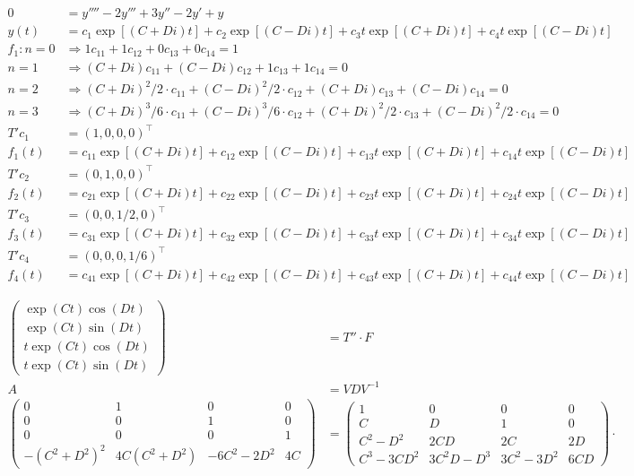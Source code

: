 \documentclass[12pt,a4paper]{article}
\begin{document}
\begin{align}
0 &= y'''' - 2 y''' + 3 y'' - 2y' + y \\
y(t) &= c_1 \exp[(C + Di)t] + c_2 \exp[(C - Di)t] + c_3 t \exp[(C + Di)t] + c_4 t \exp[(C - Di)t] \\
f_1: n = 0 &\Rightarrow 1 c_{11} + 1 c_{12} + 0 c_{13} + 0 c_{14} = 1 \\
n = 1 &\Rightarrow (C + Di) c_{11} + (C - Di) c_{12} + 1 c_{13} + 1 c_{14} = 0  \\
n = 2 &\Rightarrow (C + Di)^2/2\cdot c_{11} + (C - Di)^2/2\cdot c_{12} + (C + Di) c_{13} + (C - Di) c_{14} = 0 \\
n = 3 &\Rightarrow (C + Di)^3/6\cdot c_{11} + (C - Di)^3/6\cdot c_{12} + (C + Di)^2/2\cdot c_{13} + (C - Di)^2/2\cdot c_{14} = 0 \\
T' c_1 &= (1,0,0,0)^\top \\
f_1(t) &= c_{11} \exp[(C + Di)t] + c_{12} \exp[(C - Di)t] + c_{13} t \exp[(C + Di)t] + c_{14} t \exp[(C - Di)t] \\
T' c_2 &= (0,1,0,0)^\top \\
f_2(t) &= c_{21} \exp[(C + Di)t] + c_{22} \exp[(C - Di)t] + c_{23} t \exp[(C + Di)t] + c_{24} t \exp[(C - Di)t] \\
T' c_3 &= (0,0,1/2,0)^\top \\
f_3(t) &= c_{31} \exp[(C + Di)t] + c_{32} \exp[(C - Di)t] + c_{33} t \exp[(C + Di)t] + c_{34} t \exp[(C - Di)t] \\
T' c_4 &= (0,0,0,1/6)^\top \\
f_4(t) &= c_{41} \exp[(C + Di)t] + c_{42} \exp[(C - Di)t] + c_{43} t \exp[(C + Di)t] + c_{44} t \exp[(C - Di)t]
\end{align}

\begin{align}
\begin{pmatrix} \exp (Ct) \cos (Dt) \\ \exp (Ct) \sin (Dt) \\ t \exp (Ct) \cos (Dt)  \\ t \exp (Ct) \sin (Dt) \end{pmatrix} &= T'' \cdot F  \\
A &= VDV^{-1} \\
\left( \begin{matrix} 0 & 1 & 0 & 0 \\ 0 & 0 & 1 & 0 \\ 0 & 0 & 0 & 1 \\ -(C^2+D^2)^2 & 4C(C^2+D^2) & -6C^2-2D^2 & 4C \end{matrix} \right)
&=
\left( \begin{matrix}  1 & 0 & 0 & 0 \\ C & D & 1 & 0 \\ C^2-D^2 & 2CD & 2C & 2D \\ C^3-3CD^2 & 3C^2D - D^3 & 3C^2-3D^2 & 6CD  \end{matrix} \right) \cdot \nonumber
\end{align}
\end{document}
